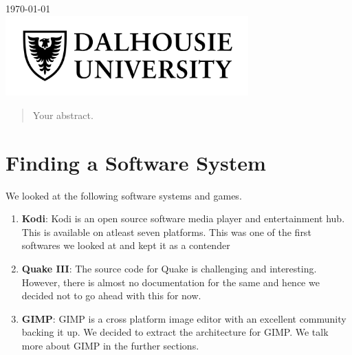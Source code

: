 \begin{titlepage}

{\large \today}\\[2cm] %


\includegraphics[width=0.7\textwidth]{dal.jpg}%
 

\vfill %

\end{titlepage}
\tableofcontents
\newpage
\begin{abstract}
Your abstract.
\end{abstract}

\section{Finding a Software System}
We looked at the following software systems and games.
\begin{enumerate}
\item \textbf{Kodi}: Kodi is an open source software media player and entertainment hub. This is available on atleast seven platforms. This was one of the first softwares we looked at and kept it as a contender

\item \textbf{Quake III}: The source code for Quake is challenging and interesting. However, there is almost no documentation for the same and hence we decided not to go ahead with this for now.

\item \textbf{GIMP}: GIMP is a cross platform image editor with an excellent community backing it up. We decided to extract the architecture for GIMP. We talk more about GIMP in the further sections.

\end{enumerate}

